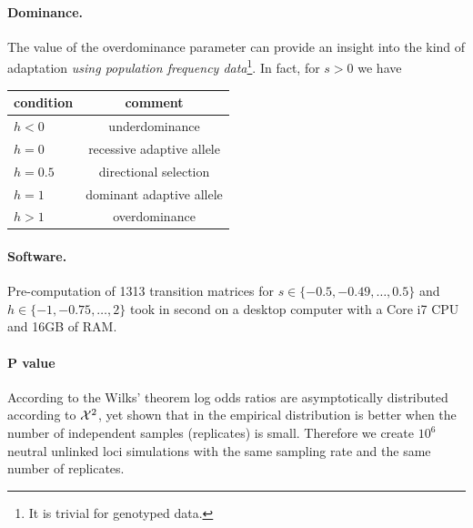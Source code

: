 \documentclass[11pt]{article}
\begin{document}
\paragraph{Dominance.}
The value of the overdominance parameter can provide an insight into the kind of adaptation \emph{using population frequency data}\footnote{It is trivial for genotyped data.}. In fact, for $s>0$ we have \cite{gillespie2010population}  
\begin{center}
	\begin{tabular}{l|c}
		condition & comment\\
		\hline
		$h<0$ &  underdominance\\
		$h=0$ & recessive adaptive allele\\
		$h=0.5$ & directional selection\\
		$h=1$&	dominant adaptive allele	\\
		$h>1$ &overdominance
		\end{tabular}
		\end{center}
		
\paragraph{Software.}
Pre-computation of 1313 transition matrices for $s\in\{-0.5,-0.49,\ldots,0.5 \}$ and $h\in \{-1,-0.75,\ldots,2\}$ took in second on a desktop computer with a Core i7 CPU and 16GB of RAM.


\paragraph{P value}
According to the Wilks’ theorem \cite{williams2001weighing}  log odds ratios are asymptotically distributed according to ${\cal X}^2$, yet \cite{feder2014Identifying} shown that in the empirical distribution is better when the number of independent samples (replicates) is small. Therefore we create $10^6$ neutral unlinked loci simulations with the same sampling rate and the same number of replicates.
\end{document}

